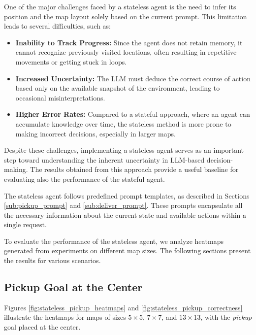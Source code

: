 One of the major challenges faced by a stateless agent is the need to infer its position
and the map layout solely based on the current prompt. This limitation leads to
several difficulties, such as:
\begin{itemize}
  \item \textbf{Inability to Track Progress:} Since the agent does not retain
    memory, it cannot recognize previously visited locations, often resulting in
    repetitive movements or getting stuck in loops.

  \item \textbf{Increased Uncertainty:} The LLM must deduce the correct course
    of action based only on the available snapshot of the environment, leading to
    occasional misinterpretations.

  \item \textbf{Higher Error Rates:} Compared to a stateful approach, where an agent
    can accumulate knowledge over time, the stateless method is more prone to
    making incorrect decisions, especially in larger maps.
\end{itemize}

Despite these challenges, implementing a stateless agent serves as an important
step toward understanding the inherent uncertainty in LLM-based decision-making.
The results obtained from this approach provide a useful baseline for evaluating
also the performance of the stateful agent.

The stateless agent follows predefined prompt templates, as described in
Sections \ref{sub:pickup_prompt} and \ref{sub:deliver_prompt}. These prompts encapsulate
all the necessary information about the current state and available actions within
a single request.

To evaluate the performance of the stateless agent, we analyze heatmaps
generated from experiments on different map sizes. The following sections present
the results for various scenarios.

\subsection{Pickup Goal at the Center}
\label{sub:pickup_goal_at_the_center}

Figures \ref{fig:stateless_pickup_heatmaps} and
\ref{fig:stateless_pickup_correctness} illustrate the heatmaps for maps of sizes
$5 \times 5$, $7 \times 7$, and $13 \times 13$, with the \emph{pickup} goal
placed at the center.

